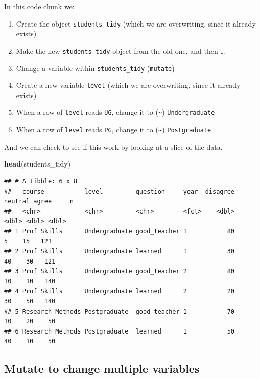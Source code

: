 \documentclass[
]{book}
\newenvironment{Shaded}{\begin{snugshade}}{\end{snugshade}}
\newcommand{\KeywordTok}[1]{\textcolor[rgb]{0.13,0.29,0.53}{\textbf{#1}}}
\newcommand{\NormalTok}[1]{#1}
\providecommand{\tightlist}{%
  \setlength{\itemsep}{0pt}\setlength{\parskip}{0pt}}
\begin{document}
\begin{translate}
In this code chunk we:

\begin{enumerate}
\def\labelenumi{\arabic{enumi}.}
\tightlist
\item
  Create the object \texttt{students\_tidy} (which we are overwriting,
  since it already exists)
\item
  Make the new \texttt{students\_tidy} object from the old one, and then
  \ldots{}
\item
  Change a variable within \texttt{students\_tidy} (\texttt{mutate})
\item
  Create a new variable \texttt{level} (which we are overwriting, since
  it already exists)
\item
  When a row of \texttt{level} reads \texttt{UG}, change it to
  (\texttt{\textasciitilde{}}) \texttt{Undergraduate}
\item
  When a row of \texttt{level} reads \texttt{PG}, change it to
  (\texttt{\textasciitilde{}}) \texttt{Postgraduate}
\end{enumerate}
\end{translate}

And we can check to see if this work by looking at a slice of the data.

\begin{Shaded}
\begin{Highlighting}[]
\KeywordTok{head}\NormalTok{(students_tidy)}
\end{Highlighting}
\end{Shaded}

\begin{verbatim}
## # A tibble: 6 x 8
##   course           level         question     year  disagree neutral agree     n
##   <chr>            <chr>         <chr>        <fct>    <dbl>   <dbl> <dbl> <dbl>
## 1 Prof Skills      Undergraduate good_teacher 1           80       5    15   121
## 2 Prof Skills      Undergraduate learned      1           30      40    30   121
## 3 Prof Skills      Undergraduate good_teacher 2           80      10    10   140
## 4 Prof Skills      Undergraduate learned      2           20      30    50   140
## 5 Research Methods Postgraduate  good_teacher 1           70      10    20    50
## 6 Research Methods Postgraduate  learned      1           50      40    10    50
\end{verbatim}

\hypertarget{mutate-to-change-multiple-variables}{%
\subsection{Mutate to change multiple variables}\label{mutate-to-change-multiple-variables}}
\end{document}
